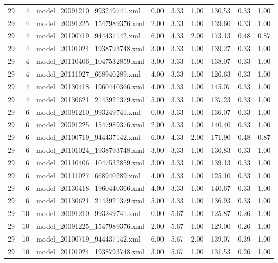 \begin{table}[ht]
\begin{tabular}{rrlrrrrrr}
   29 &   4 & model\_20091210\_993249741.xml & 0.00 & 3.33 & 1.00 & 130.53 & 0.33 & 1.00 \\ 
   29 &   4 & model\_20091225\_1547989376.xml & 2.00 & 3.33 & 1.00 & 139.60 & 0.33 & 1.00 \\ 
   29 &   4 & model\_20100719\_944437142.xml & 6.00 & 4.33 & 2.00 & 173.13 & 0.48 & 0.87 \\ 
   29 &   4 & model\_20101024\_1938793748.xml & 3.00 & 3.33 & 1.00 & 139.27 & 0.33 & 1.00 \\ 
   29 &   4 & model\_20110406\_1047532859.xml & 3.00 & 3.33 & 1.00 & 138.07 & 0.33 & 1.00 \\ 
   29 &   4 & model\_20111027\_668940289.xml & 4.00 & 3.33 & 1.00 & 126.63 & 0.33 & 1.00 \\ 
   29 &   4 & model\_20130418\_1960440366.xml & 4.00 & 3.33 & 1.00 & 145.07 & 0.33 & 1.00 \\ 
   29 &   4 & model\_20130621\_2143921379.xml & 5.00 & 3.33 & 1.00 & 137.23 & 0.33 & 1.00 \\ 
   29 &   6 & model\_20091210\_993249741.xml & 0.00 & 3.33 & 1.00 & 136.07 & 0.33 & 1.00 \\ 
   29 &   6 & model\_20091225\_1547989376.xml & 2.00 & 3.33 & 1.00 & 140.40 & 0.33 & 1.00 \\ 
   29 &   6 & model\_20100719\_944437142.xml & 6.00 & 4.33 & 2.00 & 171.90 & 0.48 & 0.87 \\ 
   29 &   6 & model\_20101024\_1938793748.xml & 3.00 & 3.33 & 1.00 & 136.83 & 0.33 & 1.00 \\ 
   29 &   6 & model\_20110406\_1047532859.xml & 3.00 & 3.33 & 1.00 & 139.13 & 0.33 & 1.00 \\ 
   29 &   6 & model\_20111027\_668940289.xml & 4.00 & 3.33 & 1.00 & 125.10 & 0.33 & 1.00 \\ 
   29 &   6 & model\_20130418\_1960440366.xml & 4.00 & 3.33 & 1.00 & 140.67 & 0.33 & 1.00 \\ 
   29 &   6 & model\_20130621\_2143921379.xml & 5.00 & 3.33 & 1.00 & 136.93 & 0.33 & 1.00 \\ 
   29 &  10 & model\_20091210\_993249741.xml & 0.00 & 5.67 & 1.00 & 125.87 & 0.26 & 1.00 \\ 
   29 &  10 & model\_20091225\_1547989376.xml & 2.00 & 5.67 & 1.00 & 129.00 & 0.26 & 1.00 \\ 
   29 &  10 & model\_20100719\_944437142.xml & 6.00 & 5.67 & 2.00 & 139.07 & 0.39 & 1.00 \\ 
   29 &  10 & model\_20101024\_1938793748.xml & 3.00 & 5.67 & 1.00 & 131.53 & 0.26 & 1.00 \\ 

\end{tabular}
\end{table}
